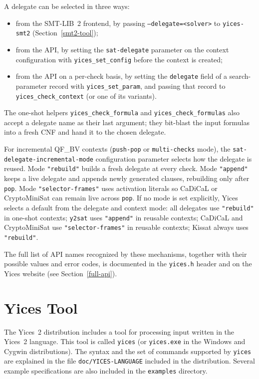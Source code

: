 \documentclass[11pt,twoside,fleqn,openright,titlepage]{cslreport}
\begin{document}
A delegate can be selected in three ways:
\begin{itemize}
\item from the SMT-LIB~2 frontend, by passing
  \texttt{--delegate=<solver>} to \texttt{yices-smt2}
  (Section~\ref{smt2-tool});
\item from the API, by setting the \texttt{sat-delegate} parameter on
  the context configuration with \texttt{yices\_set\_config} before
  the context is created;
\item from the API on a per-check basis, by setting the
  \texttt{delegate} field of a search-parameter record with
  \texttt{yices\_set\_param}, and passing that record to
  \texttt{yices\_check\_context} (or one of its variants).
\end{itemize}
The one-shot helpers \texttt{yices\_check\_formula} and
\texttt{yices\_check\_formulas} also accept a delegate name as their
last argument; they bit-blast the input formulas into a fresh CNF and
hand it to the chosen delegate.

For incremental QF\_BV contexts (\texttt{push-pop} or
\texttt{multi-checks} mode), the
\texttt{sat-delegate-incremental-mode} configuration parameter selects
how the delegate is reused. Mode \texttt{"rebuild"} builds a fresh
delegate at every check. Mode \texttt{"append"} keeps a live delegate
and appends newly generated clauses, rebuilding only after \texttt{pop}.
Mode \texttt{"selector-frames"} uses activation literals so CaDiCaL or
CryptoMiniSat can remain live across \texttt{pop}. If no mode is set
explicitly, Yices selects a default from the delegate and context mode:
all delegates use \texttt{"rebuild"} in one-shot contexts; \texttt{y2sat}
uses \texttt{"append"} in reusable contexts; CaDiCaL and CryptoMiniSat
use \texttt{"selector-frames"} in reusable contexts; Kissat always uses
\texttt{"rebuild"}.

The full list of API names recognized by these mechanisms, together
with their possible values and error codes, is documented in the
\texttt{yices.h} header and on the Yices website (see
Section~\ref{full-api}).




\chapter{Yices Tool}
\label{yices-shell}

The Yices~2 distribution includes  a tool for processing input written
in  the Yices~2  language.  This  tool is  called  \texttt{yices} (or
\texttt{yices.exe}  in  the Windows  and  Cygwin distributions).   The
syntax  and  the  set  of  commands supported  by  \texttt{yices}  are
explained  in  the file  \texttt{doc/YICES-LANGUAGE}  included in  the
distribution. Several example specifications  are also included in the
\texttt{examples} directory.
\end{document}
